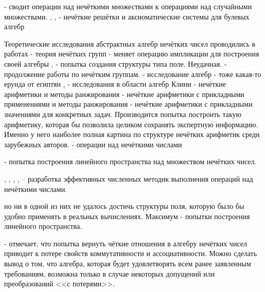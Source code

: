 
\cite{Orlov_Statistics} - сводит операции над нечёткими множествами к операциями над случайными множествами.
\cite{Fuzzy_Lattices}, \cite{Axioms_Fuzzy_Algebra}, \cite{Philosophy_Fuzzy_Structures} - нечёткие решётки и аксиоматические системы для булевых алгебр

Теоретические исследования абстрактных алгебр нечётких чисел проводились в работах
\cite{Rosenfeld_Algebras} - теория нечётких групп
\cite{Novak} - меняет операцию импликации для построения своей алгебры
\cite{Fuzzy_Fields}, \cite{Fuzzy_Fields_Revised} - попытка создания структуры типа поле. Неудачная.
\cite{Commutative_Algebra} - продолжение работы \cite{Rosenfeld_Algebras} по нечётким группам.
\cite{Serbia_Algebras} - исследование алгебр
\cite{PhD_Egypt} - тоже какая-то ерунда от египтян
\cite{Batyrshin}, \cite{Hybrid_Systems} - исследования в области алгебр Клини
\cite{Borisov_Fedulov_Arithmetics} - нечёткие арифметики и методы ранжирования
\cite{Zak} - нечёткие арифметики с прикладными применениями и методы ранжирования
\cite{Hanss, Hanss_Engineering, Hanss_Strict_Arithmetic} - нечёткие арифметики с прикладными значениями для конкретных задач. Производится попытка построить такую арифметику, которая бы позволила целиком сохранять экспертную информацию. Именно у него наиболее полная картина по структуре нечётких арифметик среди зарубежных авторов.
\cite{Yager_Filev} - операции над нечёткими числами

\cite{Kosinski} - попытка построения линейного пространства над множеством нечётких чисел.

\cite{Kruglov_Balashov}, \cite{Bocharnkinov_Ukraine}, \cite{Gallyamov}, \cite{Bangladesh}, \cite{Koroteev_Fuzzy_Arithmetics} -- разработка эффективных численных методик выполнения операций над нечёткими числами.


но ни в одной из них не удалось достичь структуры поля, которую было бы удобно применять в реальных вычислениях. Максимум - попытки построения линейного пространства.

\cite{Kreinovich_100plus1} - отмечает, что попытка вернуть чёткие отношения в алгебру нечётких чисел приводит к потере свойств коммутативности и ассоциативности. Можно сделать вывод о том, что алгебра, которая будет удовлетворять всем ранее заявленным требованиям, возможна только в случае некоторых допущений или преобразований <<с потерями>>.

